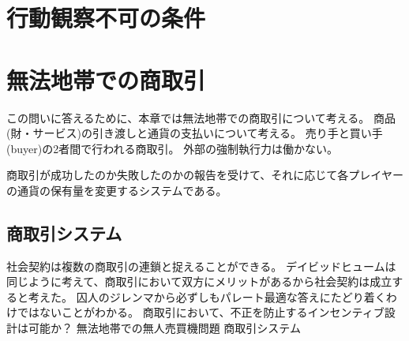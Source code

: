 \section{行動観察不可の条件}

\section{無法地帯での商取引}
この問いに答えるために、本章では無法地帯での商取引について考える。
商品(財・サービス)の引き渡しと通貨の支払いについて考える。
売り手と買い手(buyer)の2者間で行われる商取引。
外部の強制執行力は働かない。

商取引が成功したのか失敗したのかの報告を受けて、それに応じて各プレイヤーの通貨の保有量を変更するシステムである。

\subsection{商取引システム}


% 
% 
% 





社会契約は複数の商取引の連鎖と捉えることができる。
デイビッドヒュームは同じように考えて、商取引において双方にメリットがあるから社会契約は成立すると考えた。
囚人のジレンマから必ずしもパレート最適な答えにたどり着くわけではないことがわかる。
商取引において、不正を防止するインセンティブ設計は可能か？
無法地帯での無人売買機問題
商取引システム